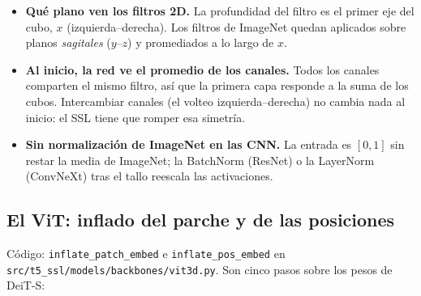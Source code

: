 \documentclass[11pt,a4paper]{article}
\begin{document}
\begin{ideabox}
\begin{itemize}[leftmargin=12pt]
\item \textbf{Qué plano ven los filtros 2D.} La profundidad del filtro es el primer eje del cubo, $x$
  (izquierda--derecha). Los filtros de ImageNet quedan aplicados sobre planos \emph{sagitales}
  ($y$--$z$) y promediados a lo largo de $x$.
\item \textbf{Al inicio, la red ve el promedio de los canales.} Todos los canales comparten el
  mismo filtro, así que la primera capa responde a la suma de los cubos. Intercambiar canales (el
  volteo izquierda--derecha) no cambia nada al inicio: el SSL tiene que romper esa simetría.
\item \textbf{Sin normalización de ImageNet en las CNN.} La entrada es $[0,1]$ sin restar la media de
  ImageNet; la BatchNorm (ResNet) o la LayerNorm (ConvNeXt) tras el tallo reescala las activaciones.
\end{itemize}
\end{ideabox}

\subsection{El ViT: inflado del parche y de las posiciones}
\label{sec:vitinflate}

Código: \texttt{inflate\_patch\_embed} e \texttt{inflate\_pos\_embed} en
\nolinkurl{src/t5_ssl/models/backbones/vit3d.py}. Son cinco pasos sobre los pesos de DeiT-S:
\end{document}
